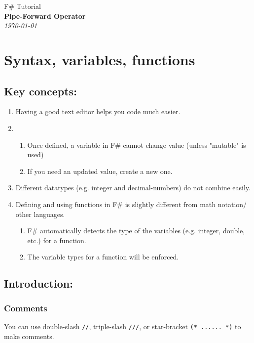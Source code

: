 \documentclass[12pt]{article}
\begin{document}
\begin{center}

{\large F\# Tutorial\\} \vspace{2mm}
\textbf{\LARGE Pipe-Forward Operator}\\
\vspace{1.5mm}
{\Large\emph{\today}}

\end{center}


\section{Syntax, variables, functions}

\subsection{Key concepts: } 

\begin{enumerate}
\item Having a good text editor helps you code much easier.
\item 
\begin{enumerate}
\item Once defined, a variable in F\# cannot change value (unless "mutable" is used)
\item If you need an updated value, create a new one.
\end{enumerate}
\item Different datatypes (e.g. integer and decimal-numbers) do not combine easily.
\item Defining and using functions in F\# is slightly different from math notation/ other languages.
\begin{enumerate}
\item F\# automatically detects the type of the variables (e.g. integer, double, etc.) for a function.
\item The variable types for a function will be enforced.
\end{enumerate}
\end{enumerate}

\subsection{Introduction: } 
\subsubsection{Comments}
You can use double-slash \texttt{//}, triple-slash \texttt{///}, or star-bracket \texttt{(* ...... *)} to make comments.
\end{document}
